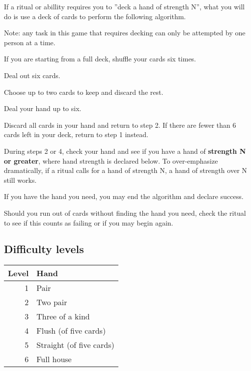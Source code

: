 \documentclass[green]{Guild Camp 2}
\begin{document}
\name{\gDecking{}}


If a ritual or abillity requires you to ''deck a hand of strength N'', what you will do is use a deck of cards to
perform the following algorithm.

Note: any task in this game that requires decking can only be attempted by one person at a time.

\begin{enum}[Algorithm]
  \item If you are starting from a full deck, shuffle your cards six times.
  \item Deal out six cards.
  \item Choose up to two cards to keep and discard the rest.
  \item Deal your hand up to six.
  \item Discard all cards in your hand and return to step 2.  If there are fewer than 6 cards left in your deck, return to step 1 instead.
\end{enum}

During steps 2 or 4, check your hand and see if you have a hand of {\bf strength N or greater}, where hand strength is declared below. To over-emphasize dramatically, if a ritual calls for a hand of strength N, a hand of strength over N still works. 

If you have the hand you need, you may end the algorithm and declare success.

Should you run out of cards without finding the hand you need, check the ritual to see if this counts as failing or if you may begin again. 
  
\subsection*{Difficulty levels}

\begin{tabular}{|r|l|}
  \hline 
  Level & Hand \\
  \hline
  1 & Pair \\
  2 & Two pair  \\
  3 & Three of a kind\\
  4 & Flush (of five cards) \\
  5 & Straight (of five cards)\\
  6 & Full house\\
  \hline
\end{tabular}
\end{document}
